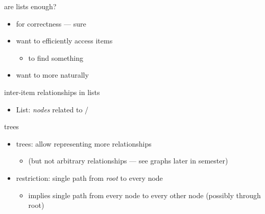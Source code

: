 \begin{frame}{are lists enough?}
\begin{itemize}
    \item for correctness --- sure
    \vspace{.5cm}
    \item want to efficiently access items
        \begin{itemize}
        \item {} to find something
        \end{itemize}
    \item want to  more naturally
\end{itemize}
\end{frame}

\begin{frame}{inter-item relationships in lists}
\begin{itemize}
\item List: \textit{nodes} related to /
\end{itemize}
\end{frame}

\begin{frame}{trees}
\begin{itemize}
    \item trees: allow representing more relationships
        \begin{itemize}
        \item (but not arbitrary relationships --- see graphs later in semester)
        \end{itemize}
    \item restriction: single path from \textit{root} to every node
        \begin{itemize}
        \item implies single path from every node to every other node (possibly through root)
        \end{itemize}
\end{itemize}
\end{frame}

